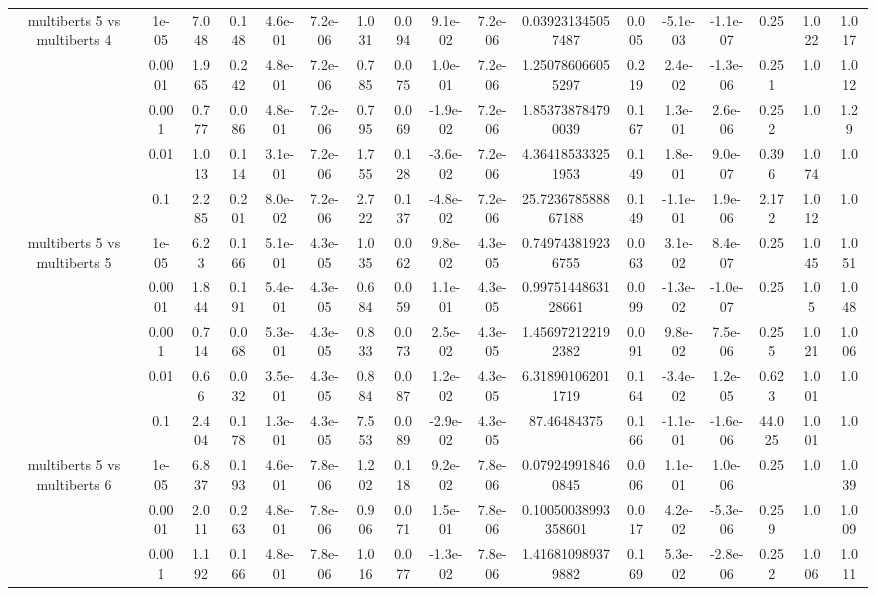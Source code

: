 \begin{tabular}{|c|c|c|c|c|c|c|c|c|c|c|c|c|c|c|c|c|}
\hline
\multirow{5}{*}{multiberts 5 vs multiberts 4} & 1e-05 & 7.048 & 0.148 & 4.6e-01 & 7.2e-06 & 1.031 & 0.094 & 9.1e-02 & 7.2e-06 & 0.039231345057487 & 0.005 & -5.1e-03 & -1.1e-07 & 0.25 & 1.022 & 1.017 \\
 & 0.0001 & 1.965 & 0.242 & 4.8e-01 & 7.2e-06 & 0.785 & 0.075 & 1.0e-01 & 7.2e-06 & 1.250786066055297 & 0.219 & 2.4e-02 & -1.3e-06 & 0.251 & 1.0 & 1.012 \\
 & 0.001 & 0.777 & 0.086 & 4.8e-01 & 7.2e-06 & 0.795 & 0.069 & -1.9e-02 & 7.2e-06 & 1.853738784790039 & 0.167 & 1.3e-01 & 2.6e-06 & 0.252 & 1.0 & 1.29 \\
 & 0.01 & 1.013 & 0.114 & 3.1e-01 & 7.2e-06 & 1.755 & 0.128 & -3.6e-02 & 7.2e-06 & 4.364185333251953 & 0.149 & 1.8e-01 & 9.0e-07 & 0.396 & 1.074 & 1.0 \\
 & 0.1 & 2.285 & 0.201 & 8.0e-02 & 7.2e-06 & 2.722 & 0.137 & -4.8e-02 & 7.2e-06 & 25.723678588867188 & 0.149 & -1.1e-01 & 1.9e-06 & 2.172 & 1.012 & 1.0 \\
\hline
\multirow{5}{*}{multiberts 5 vs multiberts 5} & 1e-05 & 6.23 & 0.166 & 5.1e-01 & 4.3e-05 & 1.035 & 0.062 & 9.8e-02 & 4.3e-05 & 0.749743819236755 & 0.063 & 3.1e-02 & 8.4e-07 & 0.25 & 1.045 & 1.051 \\
 & 0.0001 & 1.844 & 0.191 & 5.4e-01 & 4.3e-05 & 0.684 & 0.059 & 1.1e-01 & 4.3e-05 & 0.9975144863128661 & 0.099 & -1.3e-02 & -1.0e-07 & 0.25 & 1.05 & 1.048 \\
 & 0.001 & 0.714 & 0.068 & 5.3e-01 & 4.3e-05 & 0.833 & 0.073 & 2.5e-02 & 4.3e-05 & 1.456972122192382 & 0.091 & 9.8e-02 & 7.5e-06 & 0.255 & 1.021 & 1.006 \\
 & 0.01 & 0.66 & 0.032 & 3.5e-01 & 4.3e-05 & 0.884 & 0.087 & 1.2e-02 & 4.3e-05 & 6.318901062011719 & 0.164 & -3.4e-02 & 1.2e-05 & 0.623 & 1.001 & 1.0 \\
 & 0.1 & 2.404 & 0.178 & 1.3e-01 & 4.3e-05 & 7.553 & 0.089 & -2.9e-02 & 4.3e-05 & 87.46484375 & 0.166 & -1.1e-01 & -1.6e-06 & 44.025 & 1.001 & 1.0 \\
\hline
\multirow{5}{*}{multiberts 5 vs multiberts 6} & 1e-05 & 6.837 & 0.193 & 4.6e-01 & 7.8e-06 & 1.202 & 0.118 & 9.2e-02 & 7.8e-06 & 0.079249918460845 & 0.006 & 1.1e-01 & 1.0e-06 & 0.25 & 1.0 & 1.039 \\
 & 0.0001 & 2.011 & 0.263 & 4.8e-01 & 7.8e-06 & 0.906 & 0.071 & 1.5e-01 & 7.8e-06 & 0.10050038993358601 & 0.017 & 4.2e-02 & -5.3e-06 & 0.259 & 1.0 & 1.009 \\
 & 0.001 & 1.192 & 0.166 & 4.8e-01 & 7.8e-06 & 1.016 & 0.077 & -1.3e-02 & 7.8e-06 & 1.416810989379882 & 0.169 & 5.3e-02 & -2.8e-06 & 0.252 & 1.006 & 1.011 \\

\end{tabular}
